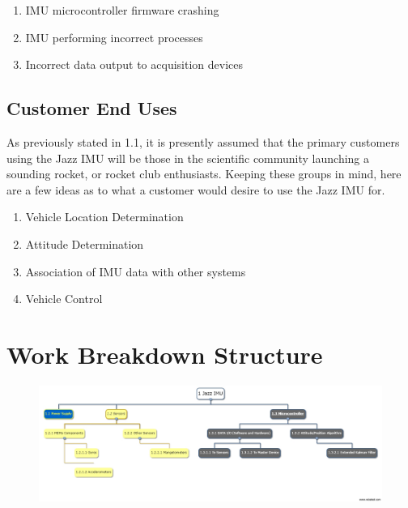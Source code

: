 \documentclass[14pt,a4paper]{article}
\begin{document}
\begin{CenturySchool}
\begin{enumerate}
			\item{IMU microcontroller firmware crashing}
			
			\item{IMU performing incorrect processes}
			
			\item{Incorrect data output to acquisition devices}
		\end{enumerate}
		
		\subsection{Customer End Uses}
		As previously stated in 1.1, it is presently assumed that the primary customers using the Jazz IMU will be those in the scientific community launching a sounding rocket, or rocket club enthusiasts. Keeping these groups in mind, here are a few ideas as to what a customer would desire to use the Jazz IMU for.
		
		\begin{enumerate}
			\item {Vehicle Location Determination}
			
			\item{Attitude Determination}
			
			\item{Association of IMU data with other systems}
			
			\item{Vehicle Control}
		\end{enumerate}
				
		\section{Work Breakdown Structure}
			\begin{figure}[H]
				\includegraphics[width=\linewidth]{associated_files/Jazz_WBS.jpg}
				\bfseries\caption{}
				\label{fig:img1)}
			\end{figure}
		

\end{CenturySchool}
\end{document}
